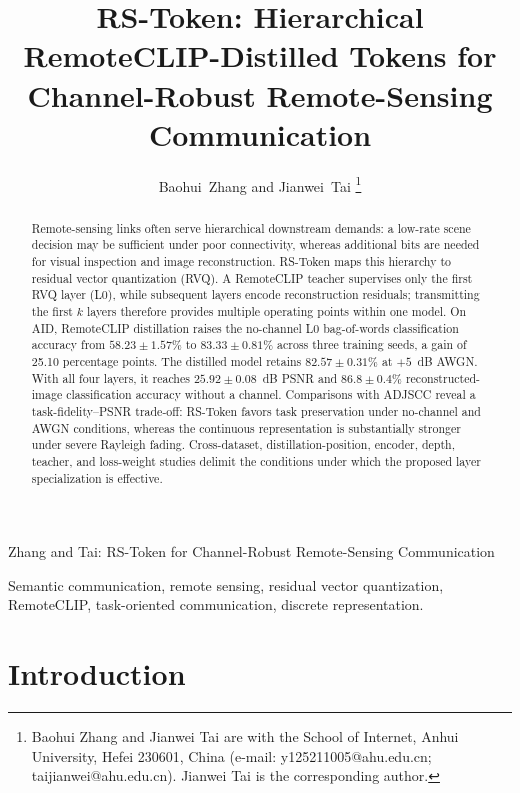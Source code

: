 \documentclass[letterpaper,journal]{IEEEtran}
\begin{document}
\title{RS-Token: Hierarchical RemoteCLIP-Distilled Tokens for Channel-Robust Remote-Sensing Communication}

\author{Baohui~Zhang and Jianwei~Tai%
\thanks{Baohui Zhang and Jianwei Tai are with the School of Internet, Anhui University, Hefei 230601, China (e-mail: y125211005@ahu.edu.cn; taijianwei@ahu.edu.cn). Jianwei Tai is the corresponding author.}}

%
{Zhang and Tai: RS-Token for Channel-Robust Remote-Sensing Communication}

\maketitle

\begin{abstract}
Remote-sensing links often serve hierarchical downstream demands: a low-rate scene decision may be sufficient under poor connectivity, whereas additional bits are needed for visual inspection and image reconstruction. RS-Token maps this hierarchy to residual vector quantization (RVQ). A RemoteCLIP teacher supervises only the first RVQ layer (L0), while subsequent layers encode reconstruction residuals; transmitting the first $k$ layers therefore provides multiple operating points within one model. On AID, RemoteCLIP distillation raises the no-channel L0 bag-of-words classification accuracy from $58.23\pm1.57\%$ to $83.33\pm0.81\%$ across three training seeds, a gain of 25.10 percentage points. The distilled model retains $82.57\pm0.31\%$ at $+5$~dB AWGN. With all four layers, it reaches $25.92\pm0.08$~dB PSNR and $86.8\pm0.4\%$ reconstructed-image classification accuracy without a channel. Comparisons with ADJSCC reveal a task-fidelity--PSNR trade-off: RS-Token favors task preservation under no-channel and AWGN conditions, whereas the continuous representation is substantially stronger under severe Rayleigh fading. Cross-dataset, distillation-position, encoder, depth, teacher, and loss-weight studies delimit the conditions under which the proposed layer specialization is effective.
\end{abstract}

\begin{IEEEkeywords}
Semantic communication, remote sensing, residual vector quantization, RemoteCLIP, task-oriented communication, discrete representation.
\end{IEEEkeywords}

\section{Introduction}
\label{sec:introduction}
\end{document}
